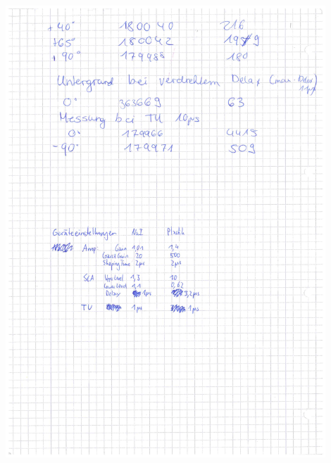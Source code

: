 \documentclass[12pt,listof=totoc]{scrartcl}
\begin{document}
\begin{minipage}{\textwidth}
	\centering
	\includegraphics[width=0.9\textwidth]{figures/Laborheft2.pdf}
\end{minipage}
\label{Laborbuch}
\newpage
\end{document}
